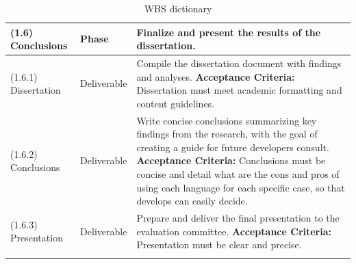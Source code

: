\begin{longtable}{|p{3cm}|p{2.5cm}|p{8cm}|}
    (1.6) Conclusions              & Phase                 & Finalize and present the results of the dissertation.                                                                                                                                                                                                                                                                                                     \\ \hline
    (1.6.1) Dissertation           & Deliverable           & Compile the dissertation document with findings and analyses. \newline \textbf{Acceptance Criteria:} Dissertation must meet academic formatting and content guidelines.                                                                                                                                                                                   \\ \hline
    (1.6.2) Conclusions            & Deliverable           & Write concise conclusions summarizing key findings from the research, with the goal of creating a guide for future developers consult. \newline \textbf{Acceptance Criteria:} Conclusions must be concise and detail what are the cons and pros of using each language for each specific case, so that develops can easily decide.                        \\ \hline
    (1.6.3) Presentation           & Deliverable           & Prepare and deliver the final presentation to the evaluation committee. \newline \textbf{Acceptance Criteria:} Presentation must be clear and precise.                                                                                                                                                                                                    \\ \hline
    \caption{\gls{WBS} dictionary}
    \label{tab:wbs-dictionary}
\end{longtable}